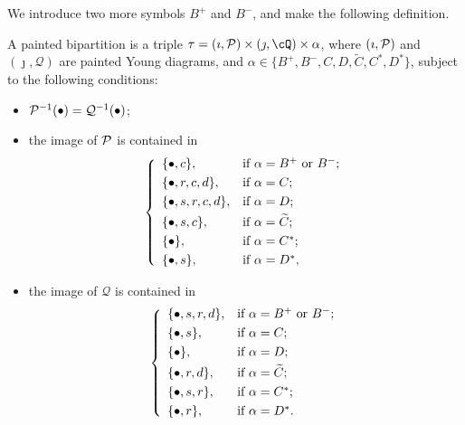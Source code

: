 \documentclass[counting_main.tex]{subfiles}
\begin{document}
We introduce two more symbols $B^+$ and $B^-$, and make the following definition.
 \begin{defn}\label{defpbp0}
 A painted bipartition is a triple $\tau=(\imath, \CP)\times (\jmath, \cQ)\times \alpha$, where $(\imath, \mathcal{P})$ and $ (\jmath, \mathcal Q)$ are painted Young diagrams, and $\alpha\in \{B^+,B^-, C,D,\widetilde {C}, C^*, D^*\}$, subject to the following conditions:
 \begin{itemize}

 \item
 $\mathcal{P}^{-1}(\bullet)=\mathcal Q^{-1}(\bullet)$;
 \item
 the image of $\mathcal{P}$ is contained in
 \[
 \left\{
     \begin{array}{ll}
         \{\bullet, c\}, &\hbox{if $\alpha=B^+$ or $B^-$}; \smallskip\\
            \{\bullet,  r, c,d\}, &\hbox{if $\alpha=C$}; \smallskip\\
          \{\bullet, s, r, c,d\}, &\hbox{if $\alpha=D$}; \smallskip\\
            \{\bullet, s, c\}, &\hbox{if $\alpha=\widetilde{ C}$}; \smallskip \\
        \{\bullet\}, &\hbox{if $\alpha=C^*$}; \smallskip \\
          \{\bullet, s\}, &\hbox{if $\alpha=D^*$},\\
            \end{array}
   \right.
 \]
 \item
 the image of $\mathcal Q$ is contained in
 \[
 \left\{
     \begin{array}{ll}
         \{\bullet, s, r, d\}, &\hbox{if $\alpha=B^+$ or $B^-$}; \smallskip\\
           \{\bullet, s\}, &\hbox{if $\alpha=C$}; \smallskip\\
           \{\bullet\}, &\hbox{if $\alpha=D$}; \smallskip\\
             \{\bullet, r, d\}, &\hbox{if $\alpha=\widetilde{ C}$}; \smallskip\\
        \{\bullet, s,r\}, &\hbox{if $\alpha=C^*$}; \smallskip \\
          \{\bullet, r\}, &\hbox{if $\alpha=D^*$}.
            \end{array}
   \right.
 \]

 \end{itemize}
 \end{defn}
\end{document}
